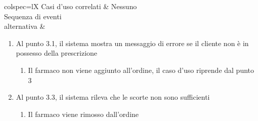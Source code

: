 \begin{table}[!hbp]
\begin{scenery}{colspec=lX}
		Casi d'uso correlati & Nessuno \\
		{Sequenza di eventi \\ alternativa} &
			\begin{enumerate}
				\item Al punto 3.1, il sistema mostra un messaggio di errore se il cliente non è in possesso della prescrizione
				\begin{enumerate}[label*=\arabic*.]
					\item Il farmaco non viene aggiunto all'ordine, il caso d'uso riprende dal punto 3
				\end{enumerate}
				\item Al punto 3.3, il sistema rileva che le scorte non sono sufficienti
					\begin{enumerate}[label*=\arabic*.]
						\item Il farmaco viene rimosso dall'ordine
					\end{enumerate}
			\end{enumerate} \\
	\end{scenery}
\end{table}

